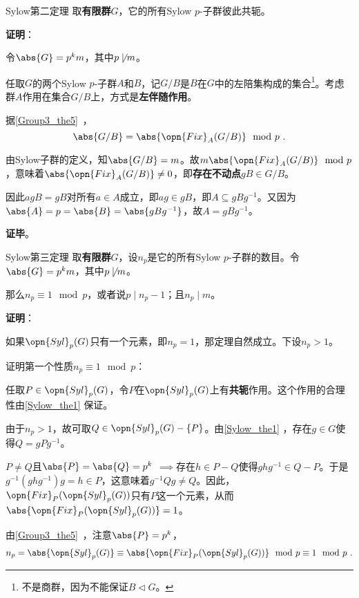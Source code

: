 \begin{theorem}{Sylow第二定理}\label{Sylow_the1}
取\textbf{有限群}$G$，它的所有Sylow $p$-子群彼此共轭。
\end{theorem}

\textbf{证明}：

令$\abs{G}=p^km$，其中$p\not\mid m$。

任取$G$的两个Sylow $p$-子群$A$和$B$，记$G/B$是$B$在$G$中的左陪集构成的集合\footnote{不是商群，因为不能保证$B\vartriangleleft G$。}。考虑群$A$作用在集合$G/B$上，方式是\textbf{左伴随作用}。

据\autoref{Group3_the5}~，
\begin{equation}
\abs{G/B} = \abs{\opn{Fix}_A(G/B)} \mod p~.
\end{equation}

由Sylow子群的定义，知$\abs{G/B}=m$。故$m\abs{\opn{Fix}_A(G/B)} \mod p$，意味着$\abs{\opn{Fix}_A(G/B)}\neq 0$，即\textbf{存在不动点}$gB\in G/B$。

因此$agB=gB$对所有$a\in A$成立，即$ag\in gB$，即$A\subseteq gBg^{-1}$。又因为$\abs{A}=p=\abs{B}=\abs{gBg^{-1}}$，故$A=gBg^{-1}$。


\textbf{证毕}。




\begin{theorem}{Sylow第三定理}\label{Sylow_the2}
取\textbf{有限群}$G$，设$n_p$是它的所有Sylow $p$-子群的数目。令$\abs{G}=p^km$，其中$p\not\mid m$。

那么$n_p\equiv 1\mod p$，或者说$p\mid n_p-1$；且$n_p\mid m$。
\end{theorem}

\textbf{证明}：

如果$\opn{Syl}_p(G)$只有一个元素，即$n_p=1$，那定理自然成立。下设$n_p>1$。


证明第一个性质$n_p\equiv 1\mod p$：

任取$P\in\opn{Syl}_p(G)$，令$P$在$\opn{Syl}_p(G)$上有\textbf{共轭}作用。这个作用的合理性由\autoref{Sylow_the1} 保证。

由于$n_p>1$，故可取$Q\in \opn{Syl}_p(G)-\{P\}$。由\autoref{Sylow_the1} ，存在$g\in G$使得$Q=gPg^{-1}$。

$P\neq Q$且$\abs{P}=\abs{Q}=p^k$ $\implies$存在$h\in P-Q$使得$ghg^{-1}\in Q-P$。于是$g^{-1}(ghg^{-1})g=h\in P$，这意味着$g^{-1}Qg\neq Q$。因此，$\opn{Fix}_P(\opn{Syl}_p(G))$只有$P$这一个元素，从而$\abs{\opn{Fix}_P(\opn{Syl}_p(G))}=1$。

由\autoref{Group3_the5}~，注意$\abs{P}=p^k$，
\begin{equation}\label{Sylow_eq1}
\begin{aligned}
n_p=\abs{\opn{Syl}_p(G)}\equiv\abs{\opn{Fix}_P(\opn{Syl}_p(G))}\mod p\equiv 1\mod p~.
\end{aligned}
\end{equation}


